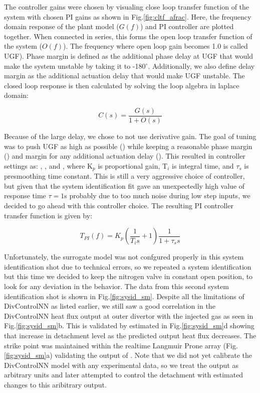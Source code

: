 The controller gains were chosen by visualing close loop transfer function of the system with chosen PI gains as shown in Fig.\ref{fig:cltf_afrac}. Here, the frequency domain response of the plant model ($G(f)$) and PI controller are plotted together. When connected in series, this forms the open loop transfer function of the system ($O(f)$). The frequency where open loop gain becomes 1.0 is called \ac{UGF}). Phase margin is defined as the additional phase delay at \ac{UGF} that would make the system unstable by taking it to -180$^\circ$. Additionally, we also define delay margin as the additional actuation delay that would make \ac{UGF} unstable. The closed loop response is then calculated by solving the loop algebra in laplace domain:

\begin{equation}
    C(s) = \frac{G(s)}{1 + O(s)}
\end{equation}

Because of the large delay, we chose to not use derivative gain. The goal of tuning was to push \ac{UGF} as high as possible (\AfracUGF) while keeping a reasonable phase margin (\AfracPhaseMargin) and margin for any additional actuation delay (\AfracDelayMargin). This resulted in controller settings as: \AfracKp, \AfracTi, and \Afracstau, where K$_p$ is proportional gain, T$_i$ is integral time, and $\tau_s$ is presmoothing time constant. This is still a very aggressive choice of controller, but given that the system identification fit gave an unexpectedly high value of response time $\tau=1$s probably due to too much noise during low step inputs, we decided to go ahead with this controller choice. The resulting PI controller transfer function is given by:

\begin{equation}
    T_{PI}(f) = K_p \left( \frac{1}{T_i s} + 1\right) \frac{1}{1 + \tau_s s}
\label{eq:PI}
\end{equation}

Unfortunately, the surrogate model was not confgured properly in this system identification shot due to technical errors, so we repeated a system identification but this time we decided to keep the nitrogen valve in constant open position, to look for any deviation in the behavior. The data from this second system identification shot is shown in Fig.\ref{fig:sysid_sm}. Despite all the limitations of DivControlNN as listed earlier, we still saw a good correlation in the DivControlNN heat flux output at outer divertor with the injected gas as seen in Fig.\ref{fig:sysid_sm}b. This is validated by estimated \Afrac in Fig.\ref{fig:sysid_sm}d showing that increase in detachment level as the predicted output heat flux decreases. The strike point was maintained within the realtime Langmuir Prone array (Fig.\ref{fig:sysid_sm}a) validating the output of \Afrac. Note that we did not yet calibrate the DivControlNN model with any experimental data, so we treat the output as arbitrary units and later attempted to control the detachment with estimated changes to this aribitrary output.

